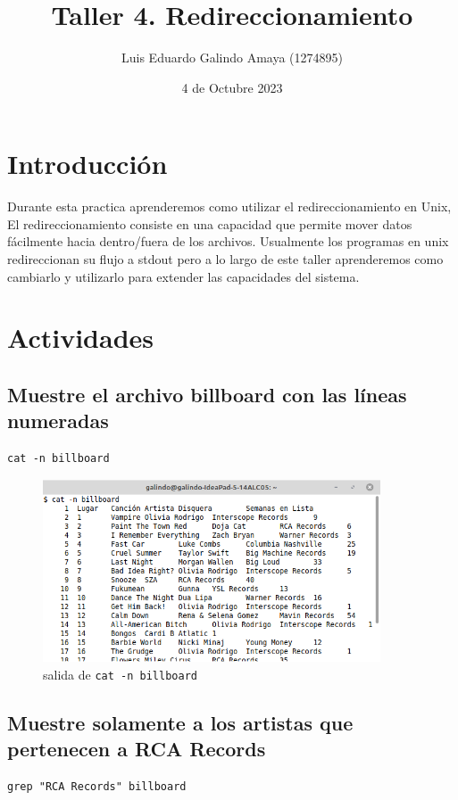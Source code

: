 \documentclass[11pt]{article}
\author{Luis Eduardo Galindo Amaya (1274895)}
\date{4 de Octubre 2023}
\title{Taller 4. Redireccionamiento}
\begin{document}
\tableofcontents \pagebreak
{}

\section{Introducción}
\label{sec:org2520a24}
Durante esta practica aprenderemos como utilizar el redireccionamiento en Unix, El redireccionamiento consiste en una capacidad que permite mover datos fácilmente hacia dentro/fuera de los archivos. Usualmente los programas en unix redireccionan su flujo a stdout pero a lo largo de este taller aprenderemos como cambiarlo y utilizarlo para extender las capacidades del sistema.

\pagebreak

\section{Actividades}
\label{sec:org8b0345e}
\subsection{Muestre el archivo billboard con las líneas numeradas}
\label{sec:orgc41ce2a}
\begin{verbatim}
cat -n billboard
\end{verbatim}

\begin{figure}[htbp]
\centering
\includegraphics[width=10cm]{img/1.png}
\caption[\texttt{cat -n billboard}]{salida de \texttt{cat -n billboard}}
\end{figure}

\subsection{Muestre solamente a los artistas que pertenecen a RCA Records}
\label{sec:org8e13ac3}
\begin{verbatim}
grep "RCA Records" billboard
\end{verbatim}
\end{document}

